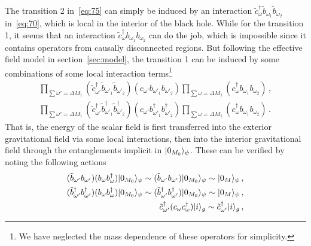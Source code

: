 \documentclass[12pt,a4paper]{article}
\begin{document}
The transition 2 in~\eqref{eq:75} can simply be induced by an interaction
$\tilde{c}_{\omega}^{\dag}\tilde{b}_{\omega_1}\tilde{b}_{\omega_2}$
in~\eqref{eq:70}, which is local in the interior of the black hole. While for the transition 1, it
seems that an interaction $\tilde{c}_{\omega}^{\dag}b_{\omega_1}b_{\omega_2}$ can do the job, which is
impossible since it contains operators from causally disconnected regions. But following the effective field model in section~\ref{sec:model}, the transition 1 can be induced by some combinations of some local interaction terms\footnote{We have neglected the mass
dependence of these operators for simplicity.}
\begin{subequations}\label{eq:76}
\begin{align}
\label{eq:76:1} \prod_{\sum\omega'=\Delta
M_1}(\tilde{c}_{\omega'}^{\dag}\tilde{b}_{\omega'_1}\tilde{b}_{\omega'_2})(c_{\omega'}b_{\omega'_1}b_{\omega'_2})\prod_{\sum\omega=\Delta
M_1}(c_{\omega}^{\dag}b_{\omega_1}b_{\omega_2})\,,
\\
\label{eq:76:2} \prod_{\sum\omega'=\Delta
M_1}(\tilde{c}_{\omega'}^{\dag}\tilde{b}_{\omega'_1}^{\dag}\tilde{b}_{\omega'_2}^{\dag})(c_{\omega'}b_{\omega'_1}^{\dag}b_{\omega'_2}^{\dag})\prod_{\sum\omega=\Delta
M_1}(c_{\omega}^{\dag}b_{\omega_1}b_{\omega_2})\,.
\end{align}
\end{subequations}
That is, the energy of the scalar field is first transferred
into the exterior gravitational field via some local
interactions, then into the interior gravitational field through the
entanglements implicit in $\arrowvert0_{M_0}\rangle_{\psi}$. These can be
verified by noting the following actions
\begin{subequations}\label{eq:77}
\begin{align}
\label{eq:77:1}
(\tilde{b}_{\omega'}b_{\omega'})(b_{\omega}b_{\omega}^{\dag})\arrowvert0_{M_0}\rangle_{\psi}\sim(\tilde{b}_{\omega'}b_{\omega'})\arrowvert0_{M_0}\rangle_{\psi}\sim\arrowvert0_M\rangle_{\psi}\,,
\\
\label{eq:77:2}
(\tilde{b}_{\omega'}^{\dag}b_{\omega'}^{\dag})(b_{\omega}b_{\omega}^{\dag})\arrowvert0_{M_0}\rangle_{\psi}\sim(\tilde{b}_{\omega'}^{\dag}b_{\omega'}^{\dag})\arrowvert0_{M_0}\rangle_{\psi}
\sim\arrowvert0_M\rangle_{\psi}\,,
\\
\label{eq:77:3}
\tilde{c}_{\omega'}^{\dag}(c_{\omega}c_{\omega}^{\dag})\arrowvert
i\rangle_g\sim\tilde{c}_{\omega'}^{\dag}\arrowvert i\rangle_g\,,
\end{align}
\end{subequations}
\end{document}

